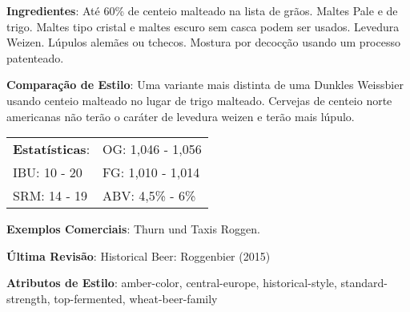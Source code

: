 \textbf{Ingredientes}: Até 60\% de centeio malteado na lista de grãos. Maltes Pale e de trigo. Maltes tipo cristal e maltes escuro sem casca podem ser usados. Levedura Weizen. Lúpulos alemães ou tchecos. Mostura por decocção usando um processo patenteado.

\textbf{Comparação de Estilo}: Uma variante mais distinta de uma Dunkles Weissbier usando centeio malteado no lugar de trigo malteado. Cervejas de centeio norte americanas não terão o caráter de levedura weizen e terão mais lúpulo.

\begin{tabular}{@{}p{35mm}p{35mm}@{}}
  \textbf{Estatísticas}: & OG: 1,046 - 1,056  \\
  IBU: 10 - 20  & FG: 1,010 - 1,014  \\
  SRM: 14 - 19 & ABV: 4,5\% - 6\%
\end{tabular}

\textbf{Exemplos Comerciais}: Thurn und Taxis Roggen.

\textbf{Última Revisão}: Historical Beer: Roggenbier (2015)

\textbf{Atributos de Estilo}: amber-color, central-europe, historical-style, standard-strength, top-fermented, wheat-beer-family
